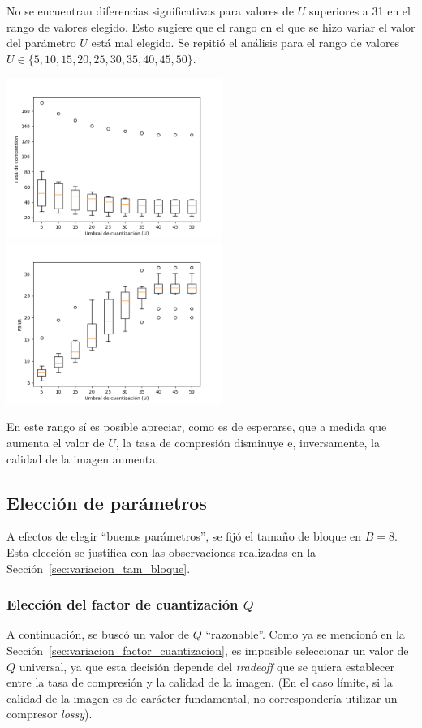 \documentclass{article}
\newcommand{\set}[1]{\{#1\}}
\begin{document}
No se encuentran diferencias significativas para valores de $U$
superiores a 31 en el rango de valores elegido.
Esto sugiere que el rango en el que se hizo variar el valor del
parámetro $U$
está mal elegido.
Se repitió el análisis para el rango de valores
$U \in \set{5, 10, 15, 20, 25, 30, 35, 40, 45, 50}$.
\begin{center}
\includegraphics[width=7cm]{../imgs/output/gray_plots/ualt_rate.png}
\includegraphics[width=7cm]{../imgs/output/gray_plots/ualt_psnr.png}
\end{center}
En este rango sí es posible apreciar, como es de esperarse, que
a medida que aumenta el valor de $U$,
la tasa de compresión disminuye e, inversamente, la calidad de
la imagen aumenta.

\subsection{Elección de parámetros}

A efectos de elegir ``buenos parámetros'', se fijó
el tamaño de bloque en $B = 8$. Esta elección se justifica con las
observaciones realizadas en la Sección~\ref{sec:variacion_tam_bloque}.

\subsubsection{Elección del factor de cuantización $Q$}

A continuación, se buscó un valor de $Q$ ``razonable''.
Como ya se mencionó en la Sección~\ref{sec:variacion_factor_cuantizacion},
es imposible seleccionar un valor de $Q$ universal, ya que esta
decisión depende del {\em tradeoff} que se quiera establecer entre
la tasa de compresión y la calidad de la imagen.
(En el caso límite, si la calidad de la imagen es de carácter fundamental,
no correspondería utilizar un compresor {\em lossy}).
\end{document}
